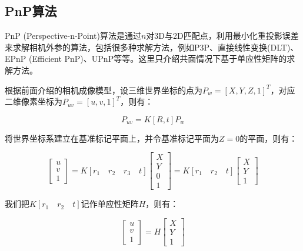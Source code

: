\subsection{PnP算法}
PnP (Perspective-n-Point)算法是通过$n$对3D与2D匹配点，利用最小化重投影误差来求解相机外参的算法，包括很多种求解方法，例如P3P、直接线性变换(DLT)、 EPnP (Efficient PnP)、UPnP等等。这里只介绍共面情况下基于单应性矩阵的求解方法。

根据前面介绍的相机成像模型，设三维世界坐标的点为$P_w=\left[X,Y,Z,1\right]^T$，对应二维像素坐标为$P_{uv}=\left[u,v,1\right]^T$，则有：

\begin{equation}\label{eq2-11}
	P_{uv} = K \left[ R, t \right] P_w
\end{equation}

将世界坐标系建立在基准标记平面上，并令基准标记平面为$Z=0$的平面，则有：

\begin{equation}\label{eq2-12}
	\left[\begin{array}{c} u \\ v \\ 1\end{array}\right] = K \left[ r_1 \quad r_2 \quad r_3 \quad t \right] \left[ \begin{array}{c} X \\ Y \\ 0 \\ 1\end{array}\right] = K \left[ r_1 \quad r_2 \quad t \right] \left[ \begin{array}{c} X \\ Y \\ 1\end{array}\right]
\end{equation}

我们把$K\left[r_1\quad r_2\quad t\right]$记作单应性矩阵$H$，则有：

\begin{equation}\label{eq2-13}
	\left[\begin{array}{c}u \\ v \\ 1 \end{array}\right] = H \left[\begin{array}{c} X \\ Y \\ 1 \end{array}\right]
\end{equation}


